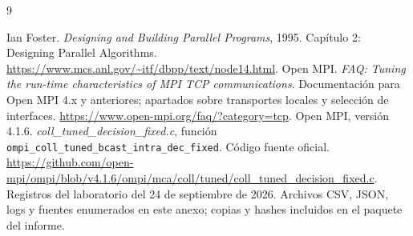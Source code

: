 \begin{thebibliography}{9}
\raggedright
{} Ian Foster. \emph{Designing and Building Parallel Programs}, 1995. Capítulo 2: Designing Parallel Algorithms. \url{https://www.mcs.anl.gov/~itf/dbpp/text/node14.html}.
 Open MPI. \emph{FAQ: Tuning the run-time characteristics of MPI TCP communications}. Documentación para Open MPI 4.x y anteriores; apartados sobre transportes locales y selección de interfaces. \url{https://www.open-mpi.org/faq/?category=tcp}.
 Open MPI, versión 4.1.6. \emph{coll\_tuned\_decision\_fixed.c}, función \texttt{ompi\_coll\_tuned\_bcast\_intra\_dec\_fixed}. Código fuente oficial. \url{https://github.com/open-mpi/ompi/blob/v4.1.6/ompi/mca/coll/tuned/coll_tuned_decision_fixed.c}.
 Registros del laboratorio del 24 de septiembre de 2026. Archivos CSV, JSON, logs y fuentes enumerados en este anexo; copias y hashes incluidos en el paquete del informe.
\end{thebibliography}
